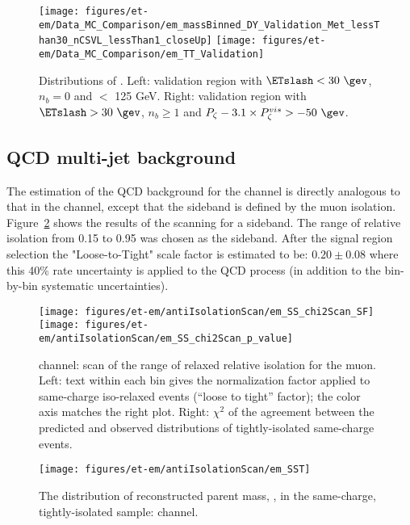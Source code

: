 \begin{figure}\centering
  \texttt{[image: figures/et-em/Data\_MC\_Comparison/em\_massBinned\_DY\_Validation\_Met\_lessThan30\_nCSVL\_lessThan1\_closeUp]}
  \texttt{[image: figures/et-em/Data\_MC\_Comparison/em\_TT\_Validation]}
  \caption{\label{fig:em_dy_tt} Distributions of \meffemu. Left:
    validation region with $\ETslash<30~\gev$, $n_b = 0$ and \meffemu $<$ 125 GeV.  Right:
    validation region with $\ETslash>30~\gev$, $n_b\geq1$ and $P_{\zeta}- 3.1 \times P_{\zeta}^{vis} > -50~\gev$.}
\end{figure}




\subsection{QCD multi-jet background}\label{sec:em_qcd}
The estimation of the QCD background for the \tetm channel is directly
analogous to that in the \teth channel, except that the sideband is
defined by the muon isolation.  Figure~\ref{fig:em_scans} shows the
results of the scanning for a sideband.  The range of relative
isolation from 0.15 to 0.95 was chosen as the sideband. After the
signal region selection the "Loose-to-Tight" scale factor is estimated
to be: $0.20 \pm 0.08$ where this 40\% rate uncertainty is applied to
the QCD process (in addition to the bin-by-bin systematic
uncertainties).

\begin{figure}\centering
  \texttt{[image: figures/et-em/antiIsolationScan/em\_SS\_chi2Scan\_SF]}
  \texttt{[image: figures/et-em/antiIsolationScan/em\_SS\_chi2Scan\_p\_value]}
  \caption{\label{fig:em_scans} \tetm channel: scan of the range of
    relaxed relative isolation for the muon.  Left: text within each
    bin gives the normalization factor applied to same-charge
    iso-relaxed events (``loose to tight'' factor); the color axis
    matches the right plot.  Right: $\chi^2$ of the agreement between
    the predicted and observed distributions of tightly-isolated
    same-charge events.}
\end{figure}

\begin{figure}\centering
  \texttt{[image: figures/et-em/antiIsolationScan/em\_SST]}
  \caption{\label{fig:em_sst} The distribution of reconstructed parent
    mass, \meffemu, in the same-charge, tightly-isolated sample: \tetm
    channel.}
\end{figure}

